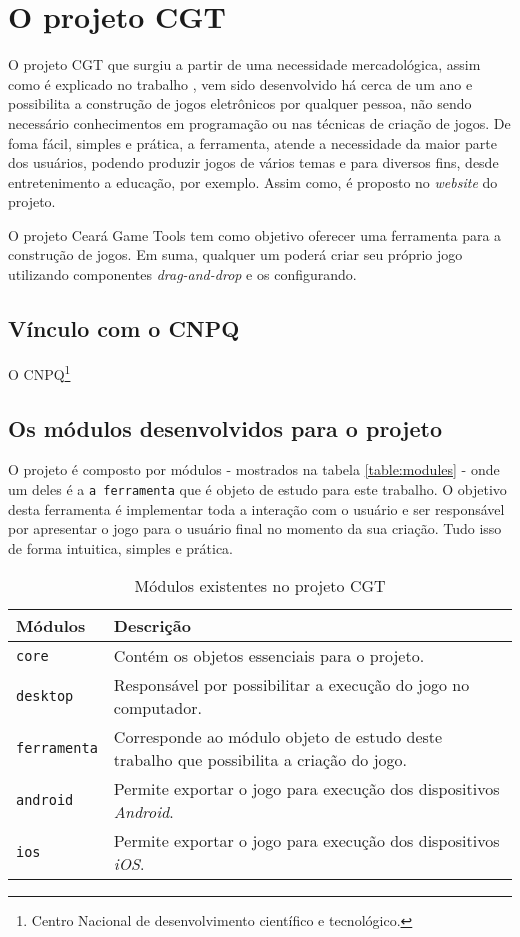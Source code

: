 \documentclass[12pt,twoside,openright,a4paper,english,brazil,sumario=tradicional]{abntex2}
\begin{document}
\section{O projeto CGT}
O projeto CGT que surgiu a partir de uma necessidade mercadológica, assim como é explicado no trabalho \cite{monografia:aquino}, vem sido desenvolvido há cerca de um ano e possibilita a construção de jogos eletrônicos por qualquer pessoa, não sendo necessário conhecimentos em programação ou nas técnicas de criação de jogos. De foma fácil, simples e prática, a ferramenta, atende a necessidade da maior parte dos usuários, podendo produzir jogos de vários temas e para diversos fins, desde entretenimento a educação, por exemplo. Assim como, é proposto no \emph{website} do projeto.

\begin{citacao}
O projeto Ceará Game Tools tem como objetivo oferecer uma ferramenta para a construção de jogos. Em suma, qualquer um poderá criar seu próprio jogo utilizando componentes \emph{drag-and-drop} e os configurando. \cite{website:projeto-cgt}
\end{citacao}

\subsection{Vínculo com o CNPQ} %
O CNPQ\footnote{Centro Nacional de desenvolvimento científico e tecnológico.}

\subsection{Os módulos desenvolvidos para o projeto}
O projeto é composto por módulos - mostrados na tabela \ref{table:modules} - onde um deles é a \texttt{a ferramenta} que é objeto de estudo para este trabalho. O objetivo desta ferramenta é implementar toda a interação com o usuário e ser responsável por apresentar o jogo para o usuário final no momento da sua criação. Tudo isso de forma intuitica, simples e prática.

\begin{table}[h]
\centering
\begin{tabular}{ | l | p{10cm} | }
    \hline
    Módulos & Descrição \\ \hline
    \texttt{core} & Contém os objetos essenciais para o projeto. \\
    \texttt{desktop} & Responsável por possibilitar a execução do jogo no computador. \\
		\texttt{ferramenta} & Corresponde ao módulo objeto de estudo deste trabalho que possibilita a criação do jogo. \\
		\texttt{android} & Permite exportar o jogo para execução dos dispositivos \emph{Android}. \\
		\texttt{ios} & Permite exportar o jogo para execução dos dispositivos \emph{iOS}. \\
    \hline
\end{tabular}
\caption{Módulos existentes no projeto CGT }
\label{table:modulos}
\end{table}
\end{document}
